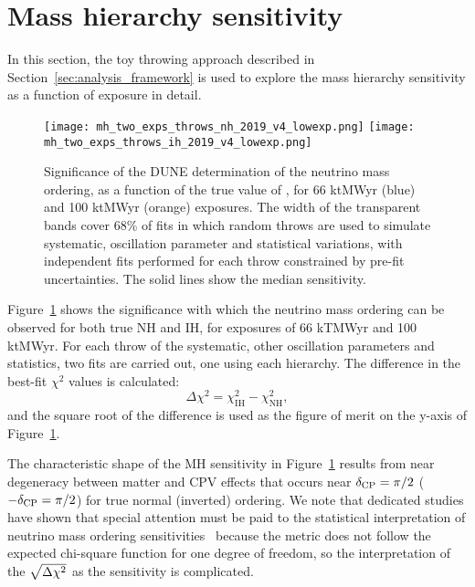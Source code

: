 \section{Mass hierarchy sensitivity}
\label{sec:mh_sens}

In this section, the toy throwing approach described in Section~\ref{sec:analysis_framework} is used to explore the mass hierarchy sensitivity as a function of exposure in detail.

\begin{figure}[htbp]
  \centering
  \texttt{[image: mh\_two\_exps\_throws\_nh\_2019\_v4\_lowexp.png]}
  \texttt{[image: mh\_two\_exps\_throws\_ih\_2019\_v4\_lowexp.png]}
  \caption{Significance of the DUNE determination of the neutrino mass ordering, as a function of the true value of \deltacp, for 66 ktMWyr (blue) and 100 ktMWyr (orange) exposures. The width of the transparent bands cover 68\% of fits in which random throws are used to simulate systematic, oscillation parameter and statistical variations, with independent fits performed for each throw constrained by pre-fit uncertainties. The solid lines show the median sensitivity.}
  \label{fig:mh_bands}
\end{figure}
Figure~\ref{fig:mh_bands} shows the significance with which the neutrino mass ordering can be observed for both true NH and IH, for exposures of 66 kTMWyr and 100 ktMWyr. For each throw of the systematic, other oscillation parameters and statistics, two fits are carried out, one using each hierarchy. The difference in the best-fit $\chi^{2}$ values is calculated:
\begin{equation}
  \Delta\chi^{2} = \chi^{2}_{\mathrm{IH}} - \chi^{2}_{\mathrm{NH}},
  \label{eq:mh_chi2}
\end{equation}
\noindent and the square root of the difference is used as the figure of merit on the y-axis of Figure~\ref{fig:mh_bands}.

The characteristic shape of the MH sensitivity in Figure~\ref{fig:mh_bands} results from near degeneracy between matter and CPV effects that occurs near $\delta_{\rm CP}=\pi/2$ ($-\delta_{\rm CP}=\pi/2$) for true normal (inverted) ordering. We note that dedicated studies have shown that special attention must be paid to the statistical interpretation of neutrino mass ordering sensitivities~\cite{Ciuffoli:2013rza,Qian:2012zn,Blennow:2013oma} because the \dchisq metric does not follow the expected chi-square function for one degree of freedom, so the interpretation of the $\sqrt{\Delta\chi^{2}}$ as the sensitivity is complicated.

